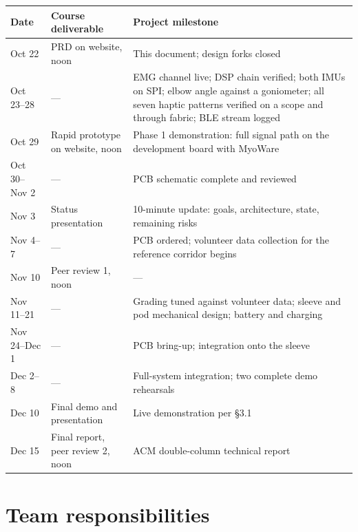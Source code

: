 \documentclass[11pt]{article}
\begin{document}
\begin{table}[H]
\centering\small
\begin{tabularx}{\linewidth}{@{}p{22mm} p{40mm} X@{}}
\toprule
\textbf{Date} & \textbf{Course deliverable} & \textbf{Project milestone} \\
\midrule
Oct 22 & PRD on website, noon & This document; design forks closed \\
Oct 23--28 & --- & EMG channel live; DSP chain verified; both IMUs on SPI; elbow angle against a goniometer; all seven haptic patterns verified on a scope and through fabric; BLE stream logged \\
Oct 29 & Rapid prototype on website, noon & Phase 1 demonstration: full signal path on the development board with MyoWare \\
Oct 30--Nov 2 & --- & PCB schematic complete and reviewed \\
Nov 3 & Status presentation & 10-minute update: goals, architecture, state, remaining risks \\
Nov 4--7 & --- & PCB ordered; volunteer data collection for the reference corridor begins \\
Nov 10 & Peer review 1, noon & --- \\
Nov 11--21 & --- & Grading tuned against volunteer data; sleeve and pod mechanical design; battery and charging \\
Nov 24--Dec 1 & --- & PCB bring-up; integration onto the sleeve \\
Dec 2--8 & --- & Full-system integration; two complete demo rehearsals \\
Dec 10 & Final demo and presentation & Live demonstration per \S3.1 \\
Dec 15 & Final report, peer review 2, noon & ACM double-column technical report \\
\bottomrule
\end{tabularx}
\end{table}

\section{Team responsibilities}
\end{document}
